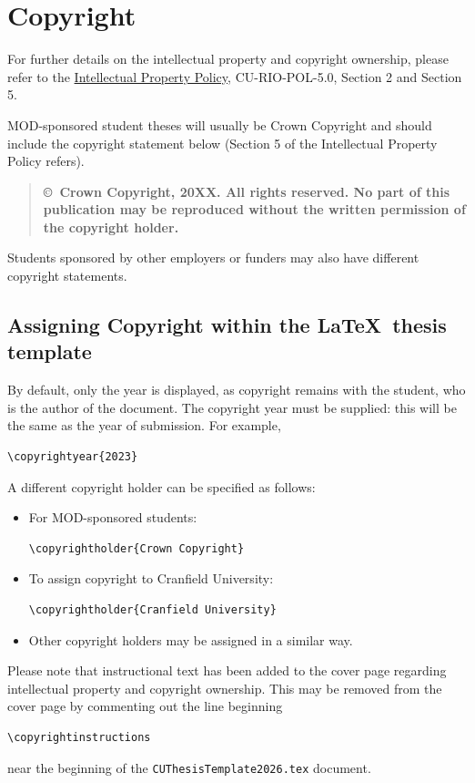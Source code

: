 \documentclass[12pt,oneside]{book} %
\begin{document}
\section{Copyright}
\label{sec:copyright}
For further details on the intellectual property and copyright ownership, please refer to the  \href{https://www.cranfield.ac.uk/-/media/files/rio/research-related-policies/intellectual-property-policy.ashx?la=en&hash=A1E0318F44085380F86D3B32BEB1B1FA0532A615}{Intellectual Property Policy}, CU-RIO-POL-5.0,  Section 2 and Section 5. 

MOD-sponsored student theses will usually be Crown Copyright and should include the copyright statement below (Section 5 of the Intellectual Property Policy refers).
\begin{quote}
\textbf{\copyright\ Crown Copyright, 20XX. All rights reserved. No part of this publication may be reproduced without the written permission of the copyright holder.}
\end{quote}
Students sponsored by other employers or funders may also have different copyright statements.

\subsection{Assigning Copyright within the \LaTeX\ thesis template}
By default, only the year is displayed, as copyright remains with the student, who is the author of the document. The copyright year must be supplied: this will be the same as the year of submission. For example,
\begin{verbatim} 
\copyrightyear{2023}
\end{verbatim}
A different copyright holder can be specified as follows:
\begin{itemize}
\item For MOD-sponsored students:
\begin{verbatim}
\copyrightholder{Crown Copyright}
\end{verbatim}
\item To assign copyright to Cranfield University:
\begin{verbatim}
\copyrightholder{Cranfield University}
\end{verbatim}
\item Other copyright holders may be assigned in a similar way.
\end{itemize}
Please note that instructional text has been added to the cover page regarding intellectual property and copyright ownership. This may be removed from the cover page by commenting out the line beginning
\begin{verbatim}
\copyrightinstructions
\end{verbatim}
near the beginning of the \texttt{CUThesisTemplate2026.tex} document.
\end{document}
